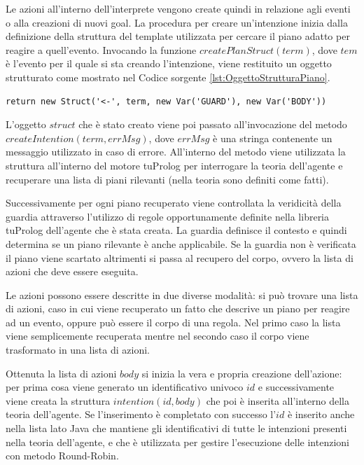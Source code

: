 Le azioni all'interno dell'interprete vengono create quindi in relazione agli eventi o alla creazioni di nuovi goal.
La procedura per creare un'intenzione inizia dalla definizione della struttura del template utilizzata per cercare il piano adatto per reagire a quell'evento. Invocando la funzione $createPlanStruct(term)$, dove $tem$ è l'evento per il quale si sta creando l'intenzione, viene restituito un oggetto strutturato come mostrato nel Codice sorgente \ref{lst:OggettoStrutturaPiano}.

\switchToJava{}{}
\begin{lstlisting}[float,firstnumber=1,label={lst:OggettoStrutturaPiano},caption={Oggetto che definisce la struttura del piano}]
return new Struct('<-', term, new Var('GUARD'), new Var('BODY'))
\end{lstlisting}

L'oggetto $struct$ che è stato creato viene poi passato all'invocazione del metodo $createIntention(term, errMsg)$, dove $errMsg$ è una stringa contenente un messaggio utilizzato in caso di errore.
All'interno del metodo viene utilizzata la struttura all'interno del motore tuProlog per interrogare la teoria dell'agente e recuperare una lista di piani rilevanti (nella teoria sono definiti come fatti).

Successivamente per ogni piano recuperato viene controllata la veridicità della guardia attraverso l'utilizzo di regole opportunamente definite nella libreria tuProlog dell'agente che è stata creata. La guardia definisce il contesto e quindi determina se un piano rilevante è anche applicabile.
Se la guardia non è verificata il piano viene scartato altrimenti si passa al recupero del corpo, ovvero la lista di azioni che deve essere eseguita.

Le azioni possono essere descritte in due diverse modalità: si può trovare una lista di azioni, caso in cui viene recuperato un fatto che descrive un piano per reagire ad un evento, oppure può essere il corpo di una regola. Nel primo caso la lista viene semplicemente recuperata mentre nel secondo caso il corpo viene trasformato in una lista di azioni.

Ottenuta la lista di azioni $body$ si inizia la vera e propria creazione dell'azione: per prima cosa viene generato un identificativo univoco $id$ e successivamente viene creata la struttura $intention(id,body)$ che poi è inserita all'interno della teoria dell'agente. Se l'inserimento è completato con successo l'$id$ è inserito anche nella lista lato Java che mantiene gli identificativi di tutte le intenzioni presenti nella teoria dell'agente, e che è utilizzata per gestire l'esecuzione delle intenzioni con metodo Round-Robin.


